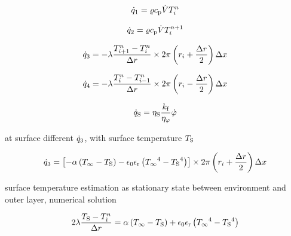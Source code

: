 \documentclass{scrartcl}
\begin{document}
    \begin{equation}
        {\dot{q}}_1 = {\varrho} {c_\mathrm{p}} {\dot{V}} {T}_{{i}}^{{n}}
        \label{eq:heat_flow_1}
    \end{equation}

    \begin{equation}
        {\dot{q}}_2 = {\varrho} {c_\mathrm{p}} {\dot{V}} {T}_{{i}}^{{n}+1}
        \label{eq:heat_flow_2}
    \end{equation}

    \begin{equation}
        {\dot{q}}_3 = -{\lambda} \frac{{T}_{{i}+1}^{{n}}-{T}_{{i}}^{{n}}}{{\Delta r}} \times 2 \pi \left( {r}_{i} + \frac{{\Delta r}}{2} \right) {\Delta x}
        \label{eq:heat_flow_3}
    \end{equation}

    \begin{equation}
        {\dot{q}}_4 = -{\lambda} \frac{{T}_{{i}}^{{n}}-{T}_{{i}-1}^{{n}}}{{\Delta r}} \times 2 \pi \left( {r}_{i} - \frac{{\Delta r}}{2} \right) {\Delta x}
        \label{eq:heat_flow_4}
    \end{equation}

    \begin{equation}
        {\dot{q}_\mathrm{S}} = {\eta_\mathrm{S}} \frac{{k_\mathrm{f}}}{{\eta_\varphi}} {\dot{\varphi}}
        \label{eq:heat_source}
    \end{equation}
    
    at surface different ${\dot{q}}_3$, with surface temperature ${T_\mathrm{S}}$

    \begin{equation}
        {\dot{q}}_3 = \left[ -{\alpha} \left( {T_\infty} - {T_\mathrm{S}} \right) - {\epsilon_0}{\epsilon_\mathrm{r}}\left( {T_\infty}^4 - {T_\mathrm{S}}^4 \right) \right]
        \times 2 \pi \left( {r}_{i} + \frac{{\Delta r}}{2} \right) {\Delta x}
        \label{eq:heat_flow_3_surface}
    \end{equation}

    surface temperature estimation as stationary state between environment and outer layer, numerical solution
    
    \begin{equation}
        2 {\lambda} \frac{{T_\mathrm{S}} - {T}_{\hat{\imath}}^{n}}{{\Delta r}} = {\alpha} \left( {T_\infty} - {T_\mathrm{S}} \right) + {\epsilon_0}{\epsilon_\mathrm{r}}\left( {T_\infty}^4 - {T_\mathrm{S}}^4 \right)
        \label{eq:surface_temperature}
    \end{equation}
    
\end{document}

